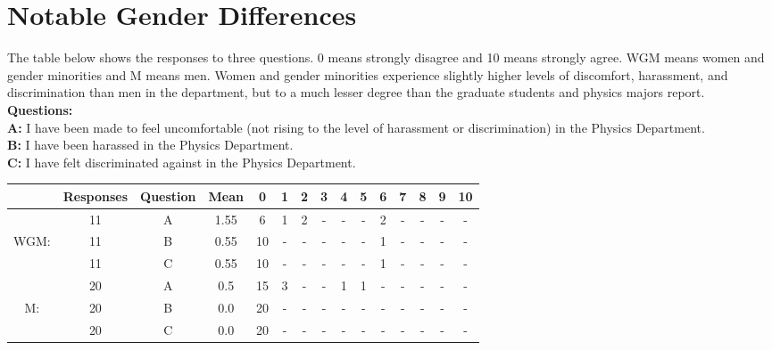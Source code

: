 \documentclass[oneside]{book}   %
\begin{document}
\section{Notable Gender Differences}

The table below shows the responses to three questions. 0 means strongly disagree and 10 means strongly agree. WGM means women and gender minorities and M means men. Women and gender minorities experience slightly higher levels of discomfort, harassment, and discrimination than men in the department, but to a much lesser degree than the graduate students and physics majors report.\\

\noindent \textbf{Questions:}\\
\noindent \textbf{A:} I have been made to feel uncomfortable (not rising to the level of harassment or discrimination) in the Physics Department.\\
\noindent \textbf{B:} I have been harassed in the Physics Department.\\
\noindent \textbf{C:} I have felt discriminated against in the Physics Department.\\

\noindent\begin{tabular}{cccc|ccccccccccc}
  & Responses & Question & Mean & 0 & 1 & 2 & 3 & 4 & 5 & 6 & 7 & 8 & 9 & 10\\
\hline
 & 11 & A & 1.55 & 6 & 1 & 2 & - & - & - & 2 & - & - & - & - \\
WGM: & 11 & B & 0.55 & 10 & - & - & - & - & - & 1 & - & - & - & - \\
 & 11 & C & 0.55 & 10 & - & - & - & - & - & 1 & - & - & - & - \\
\hline
 & 20 & A & 0.5 & 15 & 3 & - & - & 1 & 1 & - & - & - & - & - \\
M: & 20 & B & 0.0 &20 & - & - & - & - & - & - & - & - & - & - \\
 & 20 & C & 0.0 & 20 & - & - & - & - & - & - & - & - & - & - \\
\hline
\end{tabular}
\\
\end{document}
